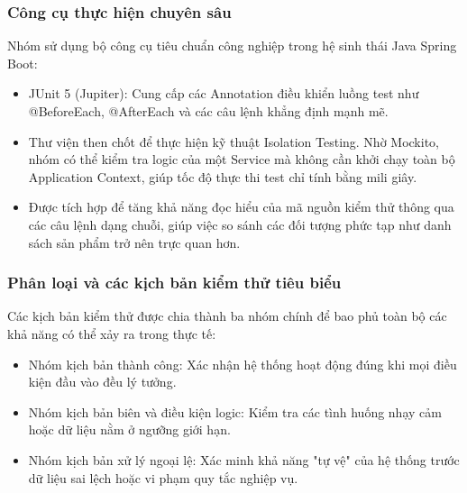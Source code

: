 \subsubsection{Công cụ thực hiện chuyên sâu}

Nhóm sử dụng bộ công cụ tiêu chuẩn công nghiệp trong hệ sinh thái Java Spring Boot:

\begin{itemize}
    \item JUnit 5 (Jupiter): Cung cấp các Annotation điều khiển luồng test như @BeforeEach, @AfterEach và các câu lệnh khẳng định mạnh mẽ.
    \item Thư viện then chốt để thực hiện kỹ thuật Isolation Testing. Nhờ Mockito, nhóm có thể kiểm tra logic của một Service mà không cần khởi chạy toàn bộ Application Context, giúp tốc độ thực thi test chỉ tính bằng mili giây.
    \item Được tích hợp để tăng khả năng đọc hiểu của mã nguồn kiểm thử thông qua các câu lệnh dạng chuỗi, giúp việc so sánh các đối tượng phức tạp như danh sách sản phẩm trở nên trực quan hơn.
\end{itemize}

\subsubsection{Phân loại và các kịch bản kiểm thử tiêu biểu}

Các kịch bản kiểm thử được chia thành ba nhóm chính để bao phủ toàn bộ các khả năng có thể xảy ra trong thực tế:

\begin{itemize}
    \item Nhóm kịch bản thành công: Xác nhận hệ thống hoạt động đúng khi mọi điều kiện đầu vào đều lý tưởng.
    \item Nhóm kịch bản biên và điều kiện logic: Kiểm tra các tình huống nhạy cảm hoặc dữ liệu nằm ở ngưỡng giới hạn.
    \item Nhóm kịch bản xử lý ngoại lệ: Xác minh khả năng "tự vệ" của hệ thống trước dữ liệu sai lệch hoặc vi phạm quy tắc nghiệp vụ.
\end{itemize}

